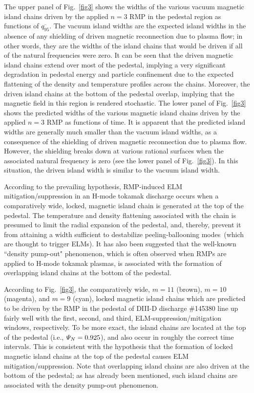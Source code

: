 \documentclass[12pt,prb,aps]{revtex4-1}
\begin{document}
The upper panel of Fig.~\ref{fig3} shows the widths of the various vacuum magnetic island chains driven by the applied $n=3$ RMP in the pedestal region as functions of $
\overline{q_{95}}$.
The vacuum island widths are the  expected island widths in the absence of any shielding of driven magnetic reconnection due to
plasma flow; in other words, they are the  widths of the island chains that would be driven if all of the natural frequencies were zero. It can be seen that
the driven magnetic island chains extend over most of the pedestal, implying a very significant degradation in pedestal energy and particle confinement due to the
expected flattening of the density and temperature profiles across the chains.\cite{flat} Moreover, the driven island chains at the
bottom of the pedestal overlap, implying that the magnetic field in this region is rendered stochastic. The lower panel
of Fig.~\ref{fig3} shows the predicted widths of the various magnetic island chains driven by the applied $n=3$ RMP as functions of time. It is apparent 
that the predicted island widths are generally much smaller than the vacuum island widths, as a consequence of the shielding of driven magnetic
reconnection due to plasma flow. However, the shielding breaks down at various rational surfaces when the associated natural frequency is zero (see the lower panel of
Fig.~\ref{fig3}). In this situation, the driven island width is similar to the vacuum island width.

According to the prevailing hypothesis, RMP-induced ELM mitigation/suppression in an H-mode tokamak discharge occurs when a comparatively wide, locked, magnetic
island chain is generated at the top of the pedestal.\cite{hu} The temperature and density flattening associated with the chain
is presumed to limit the radial expansion of the
pedestal, and, thereby, prevent it from attaining a width sufficient to destabilize peeling-ballooning modes\,\cite{connor}  (which are thought to trigger ELMs).\cite{d3d}
It has also been suggested that  the well-known ``density pump-out" phenomenon, which is often observed when RMPs are applied
to H-mode tokamak plasmas, is associated with the formation of overlapping island chains
at the bottom of the pedestal.\cite{hu}

According to Fig.~\ref{fig3},  
 the comparatively wide, $m=11$ (brown),  $m=10$ (magenta), and  $m=9$ (cyan), locked magnetic island chains which are predicted to be driven by the RMP in the pedestal of DIII-D discharge \#145380 line up
fairly well with the first, second, and third, ELM-suppression/mitigation windows, respectively. To be more exact, the island chains are located at
the top of the pedestal (i.e., ${\mit\Psi}_N=0.925$), and also occur in roughly the correct time intervals. This is consistent with the hypothesis that the formation of locked
magnetic island chains at the top of the pedestal causes ELM mitigation/suppression. 
Note that overlapping island chains
are also driven at the bottom of the pedestal; as has already been mentioned, such island chains are associated with the density pump-out phenomenon. 
\end{document}
